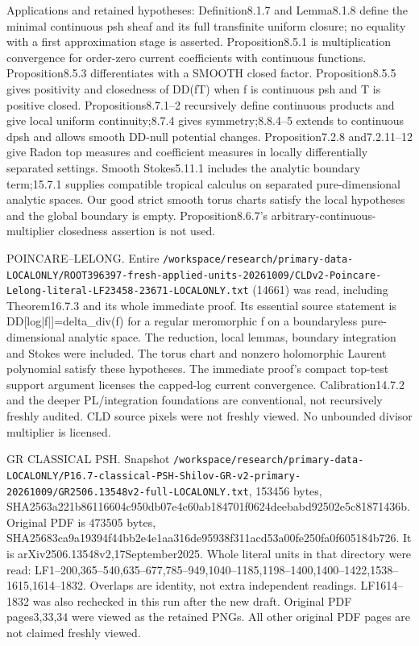 \documentclass[11pt]{article}
\begin{document}
Applications and retained hypotheses: Definition8.1.7 and Lemma8.1.8 define the minimal continuous psh sheaf and its full transfinite uniform closure; no equality with a first approximation stage is asserted. Proposition8.5.1 is multiplication convergence for order-zero current coefficients with continuous functions. Proposition8.5.3 differentiates with a SMOOTH closed factor. Proposition8.5.5 gives positivity and closedness of DD(fT) when f is continuous psh and T is positive closed. Propositions8.7.1--2 recursively define continuous products and give local uniform continuity;8.7.4 gives symmetry;8.8.4--5 extends to continuous dpsh and allows smooth DD-null potential changes. Proposition7.2.8 and7.2.11--12 give Radon top measures and coefficient measures in locally differentially separated settings. Smooth Stokes5.11.1 includes the analytic boundary term;15.7.1 supplies compatible tropical calculus on separated pure-dimensional analytic spaces. Our good strict smooth torus charts satisfy the local hypotheses and the global boundary is empty. Proposition8.6.7's arbitrary-continuous-multiplier closedness assertion is not used.

POINCARE--LELONG. Entire \texttt{/\allowbreak workspace/\allowbreak research/\allowbreak primary-data-LOCALONLY/\allowbreak ROOT396397-fresh-applied-units-20261009/\allowbreak CLDv2-Poincare-Lelong-literal-LF23458-23671-LOCALONLY.txt} (14661) was read, including Theorem16.7.3 and its whole immediate proof. Its essential source statement is DD[log|f|]=delta\_div(f) for a regular meromorphic f on a boundaryless pure-dimensional analytic space. The reduction, local lemmas, boundary integration and Stokes were included. The torus chart and nonzero holomorphic Laurent polynomial satisfy these hypotheses. The immediate proof's compact top-test support argument licenses the capped-log current convergence. Calibration14.7.2 and the deeper PL/integration foundations are conventional, not recursively freshly audited. CLD source pixels were not freshly viewed. No unbounded divisor multiplier is licensed.

GR CLASSICAL PSH. Snapshot \texttt{/\allowbreak workspace/\allowbreak research/\allowbreak primary-data-LOCALONLY/\allowbreak P16.7-classical-PSH-Shilov-GR-v2-primary-20261009/\allowbreak GR2506.13548v2-full-LOCALONLY.txt}, 153456 bytes, SHA2563a221b86116604c950db07e4c60ab184701f0624deebabd92502e5c81871436b. Original PDF is 473505 bytes, SHA25683ca9a19394f44bb2e4e1aa316de95938f311acd53a00fe250fa0f605184b726. It is arXiv2506.13548v2,17September2025. Whole literal units in that directory were read: LF1--200,365--540,635--677,785--949,1040--1185,1198--1400,1400--1422,1538--1615,1614--1832. Overlaps are identity, not extra independent readings. LF1614--1832 was also rechecked in this run after the new draft. Original PDF pages3,33,34 were viewed as the retained PNGs. All other original PDF pages are not claimed freshly viewed.
\end{document}
